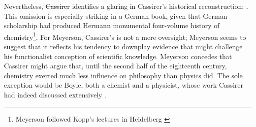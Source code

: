 \documentclass[submitted,12pt]{article}
\providecommand{\DIFadd}[1]{{\protect\color{blue}\uwave{#1}}} %
\providecommand{\DIFdel}[1]{{\protect\color{red}\sout{#1}}}                      %
\providecommand{\DIFaddbegin}{} %
\providecommand{\DIFaddend}{} %
\providecommand{\DIFdelbegin}{} %
\providecommand{\DIFdelend}{} %
\begin{document}
Nevertheless, \DIFdelbegin \DIFdel{Cassirer }\DIFdelend \DIFaddbegin \DIFadd{Meyerson }\DIFaddend identifies a glaring  in Cassirer's historical reconstruction:  \citep[102]{Meyerson1911}. This omission is especially striking in a German book, given that German scholarship had produced Hermann  monumental four-volume history of chemistry\footnote{Meyerson followed Kopp's lectures in Heidelberg \citep[31]{Bensaude-Vincent2016a}}. For Meyerson, Cassirer’s  is not a mere oversight; Meyerson seems to suggest that it reflects his tendency to downplay evidence that might challenge his functionalist conception of scientific knowledge. Meyerson concedes that Cassirer might argue that, until the second half of the eighteenth century, chemistry exerted much less influence on philosophy than physics did. The sole exception would be Boyle, both a chemist and a physicist, whose work Cassirer had indeed discussed extensively \citep[102]{Meyerson1911}.
\end{document}
